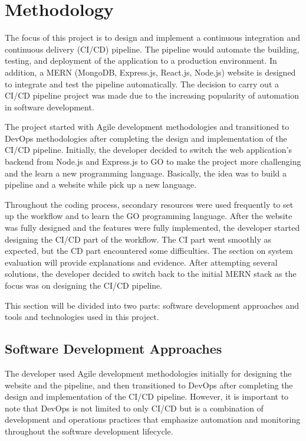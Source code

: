 \chapter{Methodology}

The focus of this project is to design and implement a continuous integration and continuous delivery (CI/CD) pipeline. The pipeline would automate the building, testing, and deployment of the application to a production environment. In addition, a MERN (MongoDB, Express.js, React.js, Node.js) website is designed to integrate and test the pipeline automatically. The decision to carry out a CI/CD pipeline project was made due to the increasing popularity of automation in software development.

The project started with Agile development methodologies and transitioned to DevOps methodologies after completing the design and implementation of the CI/CD pipeline. Initially, the developer decided to switch the web application's backend from Node.js and Express.js to GO to make the project more challenging and the learn a new programming language. Basically, the idea was to build a pipeline and a website while pick up a new language.

Throughout the coding process, secondary resources were used frequently to set up the workflow and to learn the GO programming language. After the website was fully designed and the features were fully implemented, the developer started designing the CI/CD part of the workflow. The CI part went smoothly as expected, but the CD part encountered some difficulties. The section on system evaluation will provide explanations and evidence. After attempting several solutions, the developer decided to switch back to the initial MERN stack as the focus was on designing the CI/CD pipeline.

This section will be divided into two parts: software development approaches and tools and technologies used in this project.

\section{Software Development Approaches}

The developer used Agile development methodologies initially for designing the website and the pipeline, and then transitioned to DevOps after completing the design and implementation of the CI/CD pipeline. However, it is important to note that DevOps is not limited to only CI/CD but is a combination of development and operations practices that emphasize automation and monitoring throughout the software development lifecycle.

